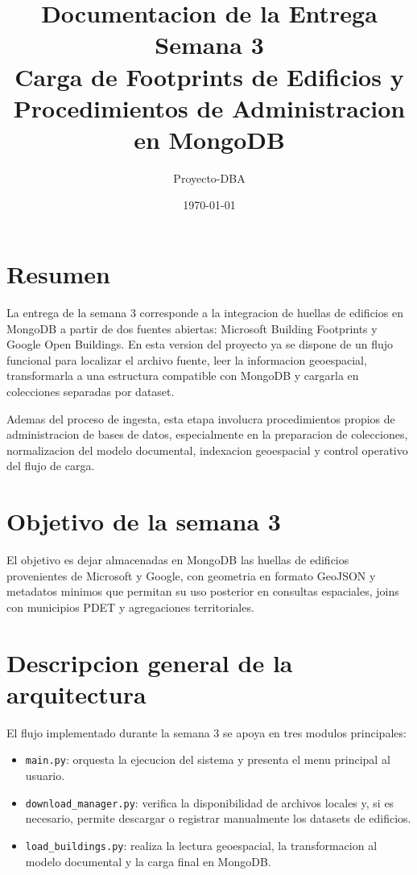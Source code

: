 \documentclass[12pt]{article}
\title{Documentacion de la Entrega Semana 3\\Carga de Footprints de Edificios y Procedimientos de Administracion en MongoDB}
\author{Proyecto-DBA}
\date{\today}
\begin{document}
\maketitle

\section{Resumen}

La entrega de la semana 3 corresponde a la integracion de huellas de edificios en MongoDB a partir de dos fuentes abiertas: Microsoft Building Footprints y Google Open Buildings. En esta version del proyecto ya se dispone de un flujo funcional para localizar el archivo fuente, leer la informacion geoespacial, transformarla a una estructura compatible con MongoDB y cargarla en colecciones separadas por dataset.

Ademas del proceso de ingesta, esta etapa involucra procedimientos propios de administracion de bases de datos, especialmente en la preparacion de colecciones, normalizacion del modelo documental, indexacion geoespacial y control operativo del flujo de carga.

\section{Objetivo de la semana 3}

El objetivo es dejar almacenadas en MongoDB las huellas de edificios provenientes de Microsoft y Google, con geometria en formato GeoJSON y metadatos minimos que permitan su uso posterior en consultas espaciales, joins con municipios PDET y agregaciones territoriales.

\section{Descripcion general de la arquitectura}

El flujo implementado durante la semana 3 se apoya en tres modulos principales:

\begin{itemize}[leftmargin=*]
    \item \texttt{main.py}: orquesta la ejecucion del sistema y presenta el menu principal al usuario.
    \item \texttt{download\_manager.py}: verifica la disponibilidad de archivos locales y, si es necesario, permite descargar o registrar manualmente los datasets de edificios.
    \item \texttt{load\_buildings.py}: realiza la lectura geoespacial, la transformacion al modelo documental y la carga final en MongoDB.
\end{itemize}
\end{document}
